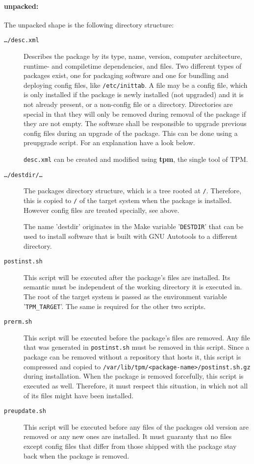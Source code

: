 \documentclass[a4paper]{article}
\newcommand{\file}[1]{\texttt{#1}}
\newcommand{\program}[1]{\textbf{#1}}
\newcommand{\variable}[1]{'\texttt{#1}'}
\begin{document}
	\paragraph{unpacked:}
	The unpacked shape is the following directory structure:
	\begin{description}
		\item[\file{\dots/desc.xml}] Describes the package by its type, name, version, computer architecture, runtime- and compiletime dependencies, and files. Two different types of packages exist, one for packaging software and one for bundling and deploying config files, like \file{/etc/inittab}. A file may be a config file, which is only installed if the package is newly installed (not upgraded) and it is not already present, or a non-config file or a directory. Directories are special in that they will only be removed during removal of the package if they are not empty. The software shall be responsible to upgrade previous config files during an upgrade of the package. This can be done using a preupgrade script. For an explanation have a look below.
		
		\file{desc.xml} can be created and modified using \program{tpm}, the single tool of TPM.
		
		\item[\file{\dots/destdir/\dots}] The packages directory structure, which is a tree rooted at \file{/}. Therefore, this is copied to \file{/} of the target system when the package is installed. However config files are treated specially, see above.
		
		The name 'destdir' originates in the Make variable \variable{DESTDIR} that can be used to install software that is built with GNU Autotools to a different directory.
		
		\item[\file{postinst.sh}] This script will be executed after the package's files are installed. Its semantic must be independent of the working directory it is executed in. The root of the target system is passed as the environment variable \variable{TPM\_TARGET}. The same is required for the other two scripts.
		
		\item[\file{prerm.sh}] This script will be executed before the package's files are removed. Any file that was generated in \file{postinst.sh} must be removed in this script. Since a package can be removed without a repository that hosts it, this script is compressed and copied to \file{/var/lib/tpm/<package-name>/postinst.sh.gz} during installation. When the package is removed forcefully, this script is executed as well. Therefore, it must respect this situation, in which not all of its files might have been installed.
		
		\item[\file{preupdate.sh}] This script will be executed before any files of the packages old version are removed or any new ones are installed. It must guaranty that no files except config files that differ from those shipped with the package stay back when the package is removed.
	\end{description}
\end{document}
